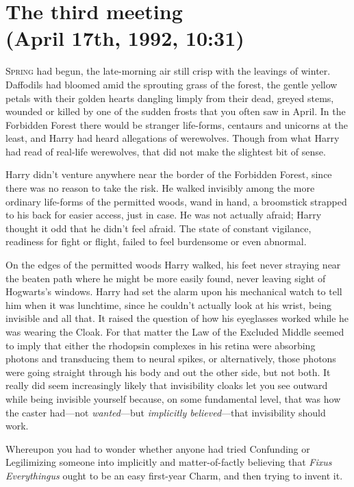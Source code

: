 
\section{The third meeting\\
(April 17th, 1992, 10:31\am)}

\lettrine{S}{pring} had begun, the late-morning air still crisp with the leavings of winter. Daffodils had bloomed amid the sprouting grass of the forest, the gentle yellow petals with their golden hearts dangling limply from their dead, greyed stems, wounded or killed by one of the sudden frosts that you often saw in April. In the Forbidden Forest there would be stranger life-forms, centaurs and unicorns at the least, and Harry had heard allegations of werewolves. Though from what Harry had read of real-life werewolves, that did not make the slightest bit of sense.

Harry didn't venture anywhere near the border of the Forbidden Forest, since there was no reason to take the risk. He walked invisibly among the more ordinary life-forms of the permitted woods, wand in hand, a broomstick strapped to his back for easier access, just in case. He was not actually afraid; Harry thought it odd that he didn't feel afraid. The state of constant vigilance, readiness for fight or flight, failed to feel burdensome or even abnormal.

On the edges of the permitted woods Harry walked, his feet never straying near the beaten path where he might be more easily found, never leaving sight of Hogwarts's windows. Harry had set the alarm upon his mechanical watch to tell him when it was lunchtime, since he couldn't actually look at his wrist, being invisible and all that. It raised the question of how his eyeglasses worked while he was wearing the Cloak. For that matter the Law of the Excluded Middle seemed to imply that either the rhodopsin complexes in his retina were absorbing photons and transducing them to neural spikes, or alternatively, those photons were going straight through his body and out the other side, but not both. It really did seem increasingly likely that invisibility cloaks let you see outward while being invisible yourself because, on some fundamental level, that was how the caster had—not \emph{wanted}—but \emph{implicitly believed}—that invisibility should work.

Whereupon you had to wonder whether anyone had tried Confunding or Legilimizing someone into implicitly and matter-of-factly believing that \emph{Fixus Everythingus} ought to be an easy first-year Charm, and then trying to invent it.

